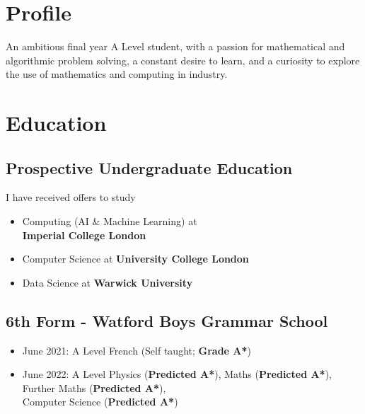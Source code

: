 \documentclass{Resume}
\begin{document}

	\section{Profile}
    An ambitious final year A Level student, with a passion for mathematical and algorithmic problem solving, a constant desire to learn, and a curiosity to explore the use of mathematics and computing in industry.


	\section{Education}
		\subsection{Prospective Undergraduate Education}
			I have received offers to study
				\begin{itemize}
					\item Computing (AI \& Machine Learning) at \\ \textbf{Imperial College London}
					\item Computer Science at \textbf{University College London}
					\item Data Science at \textbf{Warwick University}
				\end{itemize}	

		\subsection{6th Form - Watford Boys Grammar School}
				\begin{itemize}
					\item June 2021: A Level French (Self taught; \textbf{Grade A*})
					\item June 2022: A Level Physics (\textbf{Predicted A*}), Maths (\textbf{Predicted A*}), Further Maths (\textbf{Predicted A*}), \\Computer Science (\textbf{Predicted A*})
				\end{itemize}
				
\end{document}
